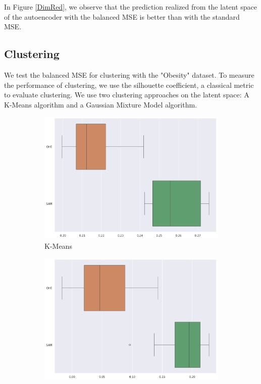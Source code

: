 \documentclass{article}
\theoremstyle{definition}
\begin{document}
In Figure \ref{DimRed}, we observe that the prediction realized from the latent space of the autoencoder with the balanced MSE is better than with the standard MSE. 





\subsection{Clustering}
We test the balanced MSE for clustering with the "Obesity" dataset. To measure the performance of clustering, we use the silhouette coefficient, a classical metric to evaluate clustering. We use two clustering approaches on the latent space: A K-Means algorithm and a Gaussian Mixture Model algorithm.

\begin{figure}[ht]
     \centering
     \begin{subfigure}[b]{0.22\textwidth}
         \centering
         \includegraphics[width=\textwidth]{imgs/Obesity/res_SIM_KL.png}
         \caption{K-Means}
         \label{Silhouette_KM}
     \end{subfigure}
     \begin{subfigure}[b]{0.22\textwidth}
         \centering
         \includegraphics[width=\textwidth]{imgs/Obesity/res_SIM_GMM.png}

\end{subfigure}
\end{figure}
\end{document}
